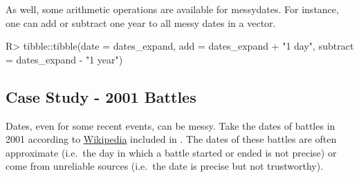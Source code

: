 \documentclass[
]{jss}
\begin{document}
As well, some arithmetic operations are available for messydates. For
instance, one can add or subtract one year to all messy dates in a
vector.

\begin{CodeChunk}
\begin{CodeInput}
R> tibble::tibble(date = dates_expand, add = dates_expand + "1 day", subtract = dates_expand - "1 year")
\end{CodeInput}
\begin{CodeOutput}
# A tibble: 7 x 3
  date                    add                                           subtract
  <mdate>                 <mdate>                                       <mdate> 
1 2001-01-01              2001-01-02                                  ~ 2000-01~
2 2001-01?                2001-01-02..2001-02-01                      ~ 2000-01~
3 2001                    2001-01-02..2002-01-01                      ~ 2000-01~
4 2001-01-01..2001-02-02  2001-01-02..2001-02-03                      ~ 2000-01~
5 {2001-01-01,2001-02-02} {2001-01-02,2001-02-03}                     ~ {2000-0~
6 2001-XX-31              {2001-02-01,2001-03-01,2001-04-01,2001-05-01~ {2000-0~
7 -0021                   -0020-12-31..-0021-12-30                    ~ -0022  ~
\end{CodeOutput}
\end{CodeChunk}

\hypertarget{case-study---2001-battles}{%
\subsection{Case Study - 2001 Battles}\label{case-study---2001-battles}}

Dates, even for some recent events, can be messy. Take the dates of
battles in 2001 according to
\href{https://en.wikipedia.org/wiki/List_of_battles_in_the_21st_century}{Wikipedia}
included in . The dates of these battles are often
approximate (i.e.~the day in which a battle started or ended is not
precise) or come from unreliable sources (i.e.~the date is precise but
not trustworthy).
\end{document}

